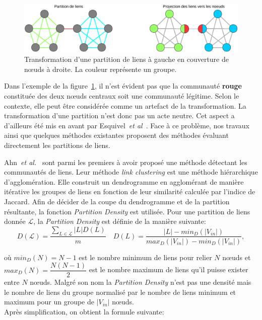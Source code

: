 \begin{figure}
\centering
\includegraphics[width=0.9\linewidth]{img/ExpectedNodes/Partition_Couverture}
\caption{Transformation d'une partition de liens à gauche en couverture de n\oe uds à droite. La couleur représente un groupe.}
\label{fig:Partition_Couverture}
\end{figure}


Dans l'exemple de la figure~\ref{fig:Partition_Couverture}, il n'est évident pas que la communauté \textcolor{briquered}{\textbf{rouge}} constituée des deux n\oe uds centraux soit une communauté légitime.
Selon le contexte, elle peut être considérée comme un artefact de la transformation.
La transformation d'une partition n'est donc pas un acte neutre.
Cet aspect a d'ailleurs été mis en avant par Esquivel~\emph{et al}~\cite{Esquivel2011}.
Face à ce problème, nos travaux ainsi que quelques méthodes existantes proposent des méthodes évaluant directement les partitions de liens.

Ahn~\emph{et al.}~\cite{Ahn2010a} sont parmi les premiers à avoir proposé une méthode détectant les communautés de liens.
Leur méthode \emph{link clustering} est une méthode hiérarchique d'agglomération.
Elle construit un dendrogramme en agglomérant de manière itérative les groupes de liens en fonction de leur similarité calculée par l'indice de Jaccard.
Afin de décider de la coupe du dendrogramme et de la partition résultante, la fonction \emph{Partition Density} est utilisée.
Pour une partition de liens donnée $\mathcal{L}$, la \emph{Partition Density} est définie de la manière suivante:
\begin{equation}
D(\mathcal{L}) = \dfrac{\sum_{L \in \mathcal{L}} |L|D(L)}{m} \quad D(L) = \dfrac{|L|- min_D(|V_{in}|) }{max_D(|V_{in}|) - min_D(|V_{in}|)},
\end{equation}

où $min_D(N) = N - 1$ est le nombre minimum de liens pour relier $N$ n\oe uds et $max_D(N) = \dfrac{N(N - 1)}{2}$ est le nombre maximum de liens qu'il puisse exister entre $N$ n\oe uds.
Malgré son nom la \emph{Partition Density} n'est pas une densité mais le nombre de liens du groupe normalisé par le nombre de liens minimum et maximum pour un groupe de $|V_{in}|$ n\oe uds.
\\
Après simplification, on obtient la formule suivante:

